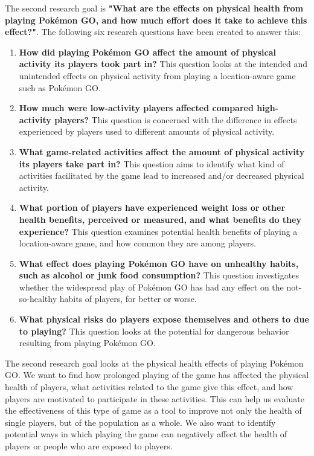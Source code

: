 The second research goal is \textbf{"What are the effects on physical health from playing Pokémon GO, and how much effort does it take to achieve this effect?"}. The following six research questions have been created to answer this:

\begin{enumerate}[label=RQ2.{\arabic*}]
	\item \textbf{How did playing Pokémon GO affect the amount of physical activity its players took part in?}\label{rq-physical-activity-amount}
		This question looks at the intended and unintended effects on physical activity from playing a location-aware game such as Pokémon GO.
	\item \textbf{How much were low-activity players affected compared high-activity players?}\label{rq-physical-high-low-comparison}
		This question is concerned with the difference in effects experienced by players used to different amounts of physical activity.
	\item \textbf{What game-related activities affect the amount of physical activity its players take part in?}\label{rq-physical-game-activities}
		This question aims to identify what kind of activities facilitated by the game lead to increased and/or decreased physical activity.
	\item \textbf{What portion of players have experienced weight loss or other health benefits, perceived or measured, and what benefits do they experience?}\label{rq-physical-weight-loss}
		This question examines potential health benefits of playing a location-aware game, and how common they are among players.
	\item \textbf{What effect does playing Pokémon GO have on unhealthy habits, such as alcohol or junk food consumption?}\label{rq-physical-unhealthy-habits}
		This question investigates whether the widespread play of Pokémon GO has had any effect on the not-so-healthy habits of players, for better or worse.
	\item \textbf{What physical risks do players expose themselves and others to due to playing?}\label{rq-physical-risks}
		This question looks at the potential for dangerous behavior resulting from playing Pokémon GO.
\end{enumerate}

The second research goal looks at the physical health effects of playing Pokémon GO. We want to find how prolonged playing of the game has affected the physical health of players, what activities related to the game give this effect, and how players are motivated to participate in these activities. This can help us evaluate the effectiveness of this type of game as a tool to improve not only the health of single players, but of the population as a whole. We also want to identify potential ways in which playing the game can negatively affect the health of players or people who are exposed to players.

